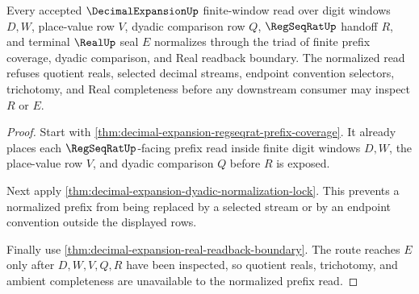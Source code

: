 \begin{theorem}
\label{thm:decimal-expansion-prefix-normalization-triad}
Every accepted $\DecimalExpansionUp$ finite-window read over digit windows $D,W$, place-value row $V$, dyadic comparison row $Q$, $\RegSeqRatUp$ handoff $R$, and terminal $\RealUp$ seal $E$ normalizes through the triad of finite prefix coverage, dyadic comparison, and Real readback boundary. The normalized read refuses quotient reals, selected decimal streams, endpoint convention selectors, trichotomy, and Real completeness before any downstream consumer may inspect $R$ or $E$.
\end{theorem}
\begin{proof}
Start with \autoref{thm:decimal-expansion-regseqrat-prefix-coverage}. It already places each $\RegSeqRatUp$-facing prefix read inside finite digit windows $D,W$, the place-value row $V$, and dyadic comparison $Q$ before $R$ is exposed.

Next apply \autoref{thm:decimal-expansion-dyadic-normalization-lock}. This prevents a normalized prefix from being replaced by a selected stream or by an endpoint convention outside the displayed rows.

Finally use \autoref{thm:decimal-expansion-real-readback-boundary}. The route reaches $E$ only after $D,W,V,Q,R$ have been inspected, so quotient reals, trichotomy, and ambient completeness are unavailable to the normalized prefix read.
\end{proof}

